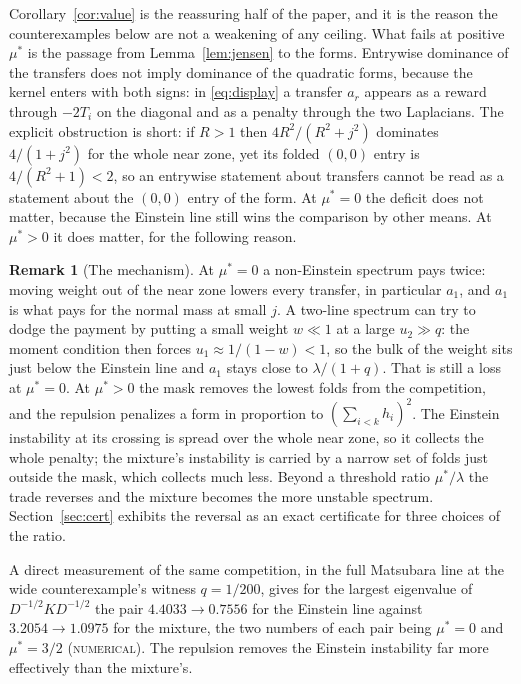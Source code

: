\documentclass[11pt]{article}
\newcommand{\muS}{\mu^{*}}
\theoremstyle{definition}
\newtheorem{remark}[theorem]{Remark}
\theoremstyle{remark}
\begin{document}
Corollary~\ref{cor:value} is the reassuring half of the paper, and it is the reason the
counterexamples below are not a weakening of any ceiling. What fails at positive $\muS$ is
the passage from Lemma~\ref{lem:jensen} to the forms. Entrywise dominance of the transfers
does not imply dominance of the quadratic forms, because the kernel enters with both
signs: in \eqref{eq:display} a transfer $a_r$ appears as a reward through $-2T_i$ on the
diagonal and as a penalty through the two Laplacians. The explicit obstruction is
short: if $R>1$ then $4R^2/(R^2+j^2)$ dominates $4/(1+j^2)$ for the whole near zone, yet
its folded $(0,0)$ entry is $4/(R^2+1)<2$, so an entrywise statement about transfers cannot
be read as a statement about the $(0,0)$ entry of the form. At $\muS=0$ the deficit does
not matter, because the Einstein line still wins the comparison by other means. At
$\muS>0$ it does matter, for the following reason.

\begin{remark}[The mechanism]\label{rem:mech}
At $\muS=0$ a non-Einstein spectrum pays twice: moving weight out of the near zone lowers
every transfer, in particular $a_1$, and $a_1$ is what pays for the normal mass at small
$j$. A two-line spectrum can try to dodge the payment by putting a small weight $w\ll1$ at
a large $u_2\gg q$: the moment condition then forces $u_1\approx1/(1-w)<1$, so the bulk of
the weight sits just below the Einstein line and $a_1$ stays close to
$\lambda/(1+q)$. That is still a loss at $\muS=0$. At $\muS>0$ the mask removes the lowest
folds from the competition, and the repulsion penalizes a form in proportion to
$(\sum_{i<k}h_i)^2$. The Einstein instability at its crossing is spread over the whole
near zone, so it collects the whole penalty; the mixture's instability is carried by a
narrow set of folds just outside the mask, which collects much less. Beyond a threshold
ratio $\muS/\lambda$ the trade reverses and the mixture becomes the more unstable
spectrum. Section~\ref{sec:cert} exhibits the reversal as an exact certificate for three
choices of the ratio.
\end{remark}

A direct measurement of the same competition, in the full Matsubara line at the wide
counterexample's witness $q=1/200$, gives for the largest eigenvalue of
$D^{-1/2}KD^{-1/2}$ the pair $4.4033\to0.7556$ for the Einstein line against
$3.2054\to1.0975$ for the mixture, the two numbers of each pair being $\muS=0$ and
$\muS=3/2$ (\textsc{numerical}). The repulsion removes the Einstein instability far more
effectively than the mixture's.
\end{document}
